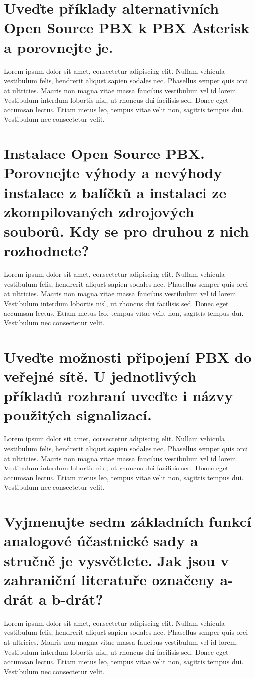 \section{Uveďte příklady alternativních Open Source PBX k PBX Asterisk a porovnejte je.}
Lorem ipsum dolor sit amet, consectetur adipiscing elit. Nullam vehicula vestibulum felis, hendrerit aliquet sapien sodales nec. Phasellus semper quis orci at ultricies. Mauris non magna vitae massa faucibus vestibulum vel id lorem. Vestibulum interdum lobortis nisl, ut rhoncus dui facilisis sed. Donec eget accumsan lectus. Etiam metus leo, tempus vitae velit non, sagittis tempus dui. Vestibulum nec consectetur velit.

\section{Instalace Open Source PBX. Porovnejte výhody a nevýhody instalace z balíčků a instalaci ze zkompilovaných zdrojových souborů. Kdy se pro druhou z nich rozhodnete?}
Lorem ipsum dolor sit amet, consectetur adipiscing elit. Nullam vehicula vestibulum felis, hendrerit aliquet sapien sodales nec. Phasellus semper quis orci at ultricies. Mauris non magna vitae massa faucibus vestibulum vel id lorem. Vestibulum interdum lobortis nisl, ut rhoncus dui facilisis sed. Donec eget accumsan lectus. Etiam metus leo, tempus vitae velit non, sagittis tempus dui. Vestibulum nec consectetur velit.

\section{Uveďte možnosti připojení PBX do veřejné sítě. U jednotlivých příkladů rozhraní uveďte i názvy použitých signalizací.}
Lorem ipsum dolor sit amet, consectetur adipiscing elit. Nullam vehicula vestibulum felis, hendrerit aliquet sapien sodales nec. Phasellus semper quis orci at ultricies. Mauris non magna vitae massa faucibus vestibulum vel id lorem. Vestibulum interdum lobortis nisl, ut rhoncus dui facilisis sed. Donec eget accumsan lectus. Etiam metus leo, tempus vitae velit non, sagittis tempus dui. Vestibulum nec consectetur velit.

\section{Vyjmenujte sedm základních funkcí analogové účastnické sady a stručně je vysvětlete. Jak jsou v zahraniční literatuře označeny a-drát a b-drát?}
Lorem ipsum dolor sit amet, consectetur adipiscing elit. Nullam vehicula vestibulum felis, hendrerit aliquet sapien sodales nec. Phasellus semper quis orci at ultricies. Mauris non magna vitae massa faucibus vestibulum vel id lorem. Vestibulum interdum lobortis nisl, ut rhoncus dui facilisis sed. Donec eget accumsan lectus. Etiam metus leo, tempus vitae velit non, sagittis tempus dui. Vestibulum nec consectetur velit.

